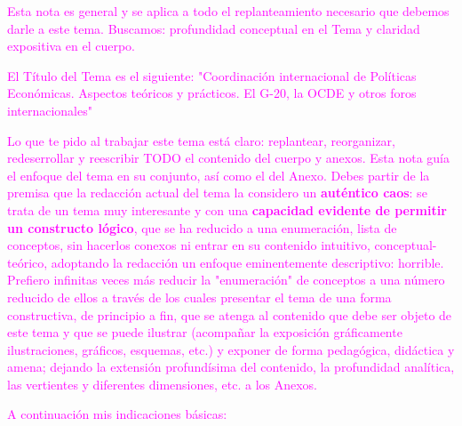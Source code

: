 \documentclass[10pt,a4paper]{article}
\newcounter{anexo}
\begin{document}
{    \textcolor{magenta}{Esta nota es general y se aplica a todo el replanteamiento necesario que debemos darle a este tema. Buscamos: profundidad conceptual en el Tema y claridad expositiva en el cuerpo.

    El Título del Tema es el siguiente: "Coordinación internacional de Políticas Económicas. Aspectos teóricos y prácticos. El G-20, la OCDE y otros foros internacionales"

    Lo que te pido al trabajar este tema está claro: replantear, reorganizar, redeserrollar y reescribir TODO el contenido del cuerpo y anexos. Esta nota guía el enfoque del tema en su conjunto, así como el del Anexo. Debes partir de la premisa que la redacción actual del tema la considero un \textbf{auténtico caos}: se trata de un tema muy interesante y con una \textbf{capacidad evidente de permitir un constructo lógico}, que se ha reducido a una enumeración, lista de conceptos, sin hacerlos conexos ni entrar en su contenido intuitivo, conceptual-teórico, adoptando la redacción un enfoque eminentemente descriptivo: horrible. Prefiero infinitas veces más reducir la "enumeración" de conceptos a una número reducido de ellos a través de los cuales presentar el tema de una forma constructiva, de principio a fin, que se atenga al contenido que debe ser objeto de este tema y que se puede ilustrar (acompañar la exposición gráficamente ilustraciones, gráficos, esquemas, etc.) y exponer de forma pedagógica, didáctica y amena; dejando la extensión profundísima del contenido, la profundidad analítica, las vertientes y diferentes dimensiones, etc. a los Anexos.
    
    A continuación mis indicaciones básicas:
    
}}
\end{document}
